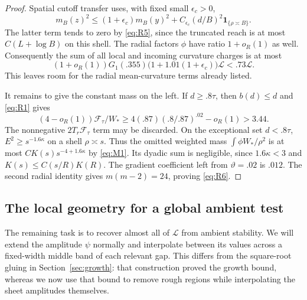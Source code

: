 \begin{proof}
Spatial cutoff transfer uses, with fixed small $\epsilon_c>0$,
\[
 m_B(z)^2\le(1+\epsilon_c)m_B(y)^2+
 C_{\epsilon_c}(d/B)^2\mathbf1_{\{\rho\asymp B\}}.
\]
The latter term tends to zero by \eqref{eq:R5}, since the truncated
reach is at most $C(L+\log B)$ on this shell. The radial factors
$\phi$ have ratio $1+o_R(1)$ as well.
Consequently the sum of all local and incoming curvature charges is
at most
\[
 (1+o_R(1))G_1(.355)\bigl(1+1.01(1+\epsilon_c)\bigr)\mathcal L
 <.73\mathcal L .
\]
This leaves room for the radial mean-curvature terms already listed.

It remains to give the constant mass on the left. If $d\ge .8\tau$,
then $b(d)\le d$ and \eqref{eq:R1} gives
\[
 (4-o_R(1))\mathcal F_\tau/W_*
 \ge 4(.87)(.8/.87)^{.02}-o_R(1)>3.44 .
\]
The nonnegative $2T_r\mathcal F_\tau$ term may be discarded.
On the exceptional set $d<.8\tau$, $E^2\ge s^{-1.6\kappa}$ on
a shell $\rho\asymp s$. Thus the omitted weighted mass
$\int\phi W_*/\rho^2$ is at most $C K(s)s^{-4+1.6\kappa}$
by \eqref{eq:M1}. Its dyadic sum is negligible, since
$1.6\kappa<3$ and $K(s)\le C(s/R)K(R)$.
The gradient coefficient left from $\vartheta=.02$ is $.012$.
The second radial identity gives $m(m-2)=24$, proving \eqref{eq:R6}.
\end{proof}

\subsection{The local geometry for a global ambient test}

The remaining task is to recover almost all of $\mathcal L$ from ambient
stability. We will extend the amplitude $\psi$ normally and interpolate
between its values across a fixed-width middle band of each relevant
gap. This differs from the square-root gluing in
Section~\ref{sec:growth}: that construction proved the growth bound,
whereas we now use that bound to remove rough regions while interpolating
the sheet amplitudes themselves.

